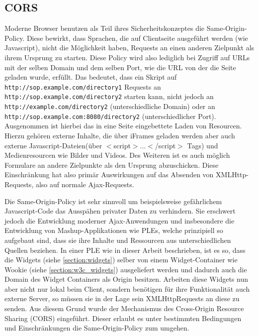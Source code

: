 \subsection{CORS}\label{section:cors}
Moderne Browser benutzen als Teil ihres Sicherheitskonzeptes die Same-Origin-Policy. Diese bewirkt, dass Sprachen, die auf Clientseite ausgeführt werden (wie Javascript), nicht die Möglichkeit haben, Requests an einen anderen Zielpunkt als ihrem Ursprung zu starten\cite{Ruderman2008}. Diese Policy wird also lediglich bei Zugriff auf URLs mit der selben Domain und dem selben Port, wie die URL von der die Seite geladen wurde, erfüllt. Das bedeutet, dass ein Skript auf \texttt{http://sop.example.com/directory1} Requests an \texttt{http://sop.example.com/directory2} starten kann, nicht jedoch an \\ \texttt{http://example.com/directory2} (unterschiedliche Domain) oder an \\ \texttt{http://sop.example.com:8080/directory2} (unterschiedlicher Port). Ausgenommen ist hierbei das in eine Seite eingebettete Laden von Resourcen. Hierzu gehören externe Inhalte, die über iFrames geladen werden aber auch externe Javascript-Dateien(über $<$script$>$...$<$/script$>$ Tags) und Medienresourcen wie Bilder und Videos. Des Weiteren ist es auch möglich Formulare an andere Zielpunkte als den Ursprung abzuschicken. Diese Einschränkung hat also primär Auswirkungen auf das Absenden von XMLHttp-Requests, also auf normale Ajax-Requests.

Die Same-Origin-Policy ist sehr sinnvoll um beispielsweise gefährlichem Javascript-Code das Ausspähen privater Daten zu verhindern. Sie erschwert jedoch die Entwicklung moderner Ajax-Anwendungen und insbesondere die Entwicklung von Mashup-Applikationen wie PLEs, welche prinzipiell so aufgebaut sind, dass sie ihre Inhalte und Ressourcen aus unterschiedlichen Quellen beziehen. In einer PLE wie in dieser Arbeit beschrieben, ist es so, dass die Widgets (siehe \ref{section:widgets}) selber von einem Widget-Container wie Wookie (siehe \ref{section:w3c_widgets}) ausgeliefert werden und dadurch auch die Domain des Widget Containers als Origin besitzen. Arbeiten diese Widgets nun aber nicht nur lokal beim Client, sondern benötigen für ihre Funktionalität auch externe Server, so müssen sie in der Lage sein XMLHttpRequests an diese zu senden. Aus diesem Grund wurde der Mechanismus des Cross-Origin Resource Sharing (CORS)\cite{vanKesteren2012} eingeführt. Dieser erlaubt es unter bestimmten Bedingungen und Einschränkungen die Same-Origin-Policy zum umgehen.

